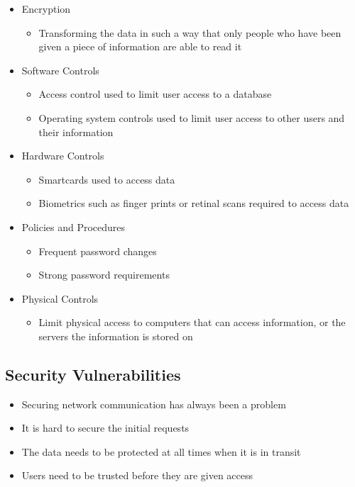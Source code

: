 \begin{itemize}
  \item Encryption
  \begin{itemize}
    \item Transforming the data in such a way that only people who have been given a piece of information are able to read it
  \end{itemize}
  \item Software Controls
  \begin{itemize}
    \item Access control used to limit user access to a database
    \item Operating system controls used to limit user access to other users and their information
  \end{itemize}
  \item Hardware Controls
  \begin{itemize}
    \item Smartcards used to access data
    \item Biometrics such as finger prints or retinal scans required to access data
  \end{itemize}
  \item Policies and Procedures
  \begin{itemize}
    \item Frequent password changes
    \item Strong password requirements
  \end{itemize}
  \item Physical Controls
  \begin{itemize}
    \item Limit physical access to computers that can access information, or the servers the information is stored on
  \end{itemize}
\end{itemize}
\subsection*{Security Vulnerabilities}

\begin{itemize}
  \item Securing network communication has always been a problem
  \item It is hard to secure the initial requests
  \item The data needs to be protected at all times when it is in transit
  \item Users need to be trusted before they are given access
\end{itemize}